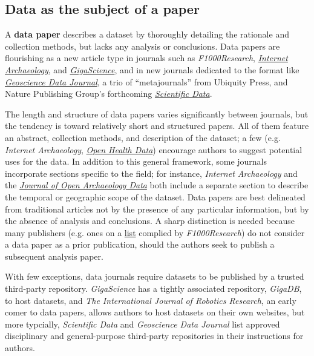 \documentclass[10pt,twocolumn]{article}
\begin{document}
 
\subsection*{Data as the subject of a paper}\label{paper-subject-data}

A \textbf{data paper} describes a dataset by thoroughly detailing the rationale and collection methods, but lacks any analysis or conclusions.\cite{newman_data_2009}
Data papers are flourishing as a new article type in journals such as \emph{F1000Research}, \href{http://www.internetarchaeology.org/}{\emph{Internet Archaeology}}, and \href{http://www.gigasciencejournal.com/}{\emph{GigaScience}}\cite{gigascience}, and in new journals dedicated to the format like \href{http://onlinelibrary.wiley.com/journal/10.1002/%28ISSN%292049-6060}{\emph{Geoscience Data Journal}}\cite{geoscience_data_journal}, a trio of ``metajournals'' from Ubiquity Press, and Nature Publishing Group's forthcoming \href{http://www.nature.com/scientificdata/}{\emph{Scientific Data}}.

The length and structure of data papers varies significantly between journals, but the tendency is toward relatively short and structured papers.
All of them feature an abstract, collection methods, and description of the dataset; a few (e.g. \emph{Internet Archaeology}, \href{http://openhealthdata.metajnl.com/about/submissions#authorGuidelines}{\emph{Open Health Data}}) encourage authors to suggest potential uses for the data.
In addition to this general framework, some journals incorporate sections specific to the field; for instance, \emph{Internet Archaeology} and the \href{http://openarchaeologydata.metajnl.com/}{\emph{Journal of Open Archaeology Data}} both include a separate section to describe the  temporal or geographic scope of the dataset.
Data papers are best delineated from traditional articles not by the presence of any particular information, but by the absence of analysis and conclusions.
A sharp distinction is needed because many publishers (e.g. ones on a \href{https://f1000research.com/data-policies}{list} complied by \emph{F1000Research}) do not consider a data paper as a prior publication, should the authors seek to publish a subsequent analysis paper.

With few exceptions, data journals require datasets to be published by a trusted third-party repository.
\emph{GigaScience} has a tightly associated repository, \emph{GigaDB}, to host datasets, and \emph{The International Journal of Robotics Research}\cite{international_journal_of_robotics_research}, an early comer to data papers\cite{newman_data_2009}, allows authors to host datasets on their own websites, but more typcially, \emph{Scientific Data} and \emph{Geoscience Data Journal} list approved disciplinary and general-purpose third-party repositories in their instructions for authors.
\end{document}
